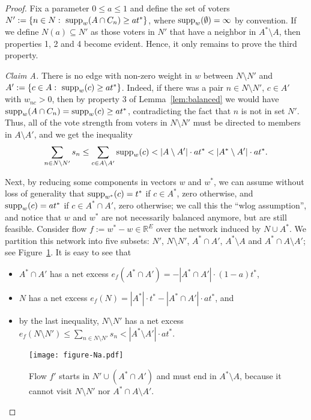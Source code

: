 \begin{proof}
Fix a parameter $0\leq a\leq 1$ and define the set of voters $N':=\{n\in N: \ \supp_w(A\cap C_n)\geq at^*\}$, where $\operatorname{supp}_w(\emptyset)=\infty$ by convention. If we define $N(a)\subseteq N'$ as those voters in $N'$ that have a neighbor in $A^*\setminus A$, then properties 1, 2 and 4 become evident. Hence, it only remains to prove the third property.

\emph{Claim A.} There is no edge with non-zero weight in $w$ between $N\setminus N'$ and $A':=\{c\in A: \ \operatorname{supp}_w(c)\geq at^*\}$. 
Indeed, if there was a pair $n\in N\setminus N'$, $c\in A'$ with $w_{nc}>0$, then by property 3 of Lemma~\ref{lem:balanced} we would have $\operatorname{supp}_w(A\cap C_n)=\operatorname{supp}_w(c)\geq at^*$, contradicting the fact that $n$ is not in set $N'$. 
Thus, all of the vote strength from voters in $N\setminus N'$ must be directed to members in $A\setminus A'$, and we get the inequality
$$\sum_{n\in N\setminus N'} s_n \leq \sum_{c\in A\setminus A'} \operatorname{supp}_w(c) < |A\setminus A'|\cdot at^*< |A^*\setminus A'|\cdot at^*.$$

Next, by reducing some components in vectors $w$ and $w^*$, we can assume without loss of generality that $\operatorname{supp}_{w^*}(c)=t^*$ if $c\in A^*$, zero otherwise, and $\operatorname{supp}_{w}(c)=a t^*$ if $c\in A^*\cap A'$, zero otherwise; we call this the ``wlog assumption'', and notice that $w$ and $w^*$ are not necessarily balanced anymore, but are still feasible.
Consider flow $f:=w^* - w\in\mathbb{R}^E$ over the network induced by $N\cup A^*$. 
We partition this network into five subsets: $N'$, $N\setminus N'$, $A^*\cap A'$, $A^*\setminus A$ and $A^*\cap A\setminus A'$; see Figure~\ref{fig:sets}.  
It is easy to see that 
\begin{itemize}
\item $A^*\cap A'$ has a net excess $e_f(A^*\cap A')=-|A^*\cap A'|\cdot (1-a)t^*$,
\item $N$ has a net excess $e_f(N)=|A^*|\cdot t^* - |A^*\cap A'|\cdot a t^*$, and
\item by the last inequality, $N\setminus N'$ has a net excess $e_f(N\setminus N')\leq \sum_{n\in N\setminus N'} s_n < |A^*\setminus A'|\cdot at^*$.
\end{itemize} 

\begin{figure}[htb]
  \centering
	\texttt{[image: figure-Na.pdf]}
  \caption{Flow $f'$ starts in $N'\cup (A^*\cap A')$ and must end in $A^*\setminus A$, because it cannot visit $N\setminus N'$ nor $A^*\cap A\setminus A'$.}
  \label{fig:sets}
\end{figure}


\end{proof}
